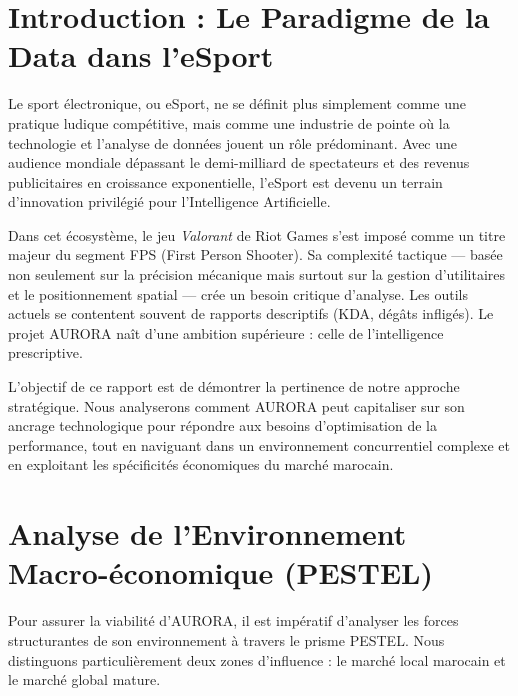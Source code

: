 \documentclass[a4paper,11pt]{article}
\begin{document}
\vspace{1cm}
\tableofcontents
\newpage
{}

\section{Introduction : Le Paradigme de la Data dans l'eSport}
Le sport électronique, ou eSport, ne se définit plus simplement comme une pratique ludique compétitive, mais comme une industrie de pointe où la technologie et l'analyse de données jouent un rôle prédominant. Avec une audience mondiale dépassant le demi-milliard de spectateurs et des revenus publicitaires en croissance exponentielle, l'eSport est devenu un terrain d'innovation privilégié pour l'Intelligence Artificielle.

Dans cet écosystème, le jeu \textit{Valorant} de Riot Games s'est imposé comme un titre majeur du segment FPS (First Person Shooter). Sa complexité tactique — basée non seulement sur la précision mécanique mais surtout sur la gestion d'utilitaires et le positionnement spatial — crée un besoin critique d'analyse. Les outils actuels se contentent souvent de rapports descriptifs (KDA, dégâts infligés). Le projet AURORA naît d'une ambition supérieure : celle de l'intelligence prescriptive. 

L'objectif de ce rapport est de démontrer la pertinence de notre approche stratégique. Nous analyserons comment AURORA peut capitaliser sur son ancrage technologique pour répondre aux besoins d'optimisation de la performance, tout en naviguant dans un environnement concurrentiel complexe et en exploitant les spécificités économiques du marché marocain.

\section{Analyse de l'Environnement Macro-économique (PESTEL)}
Pour assurer la viabilité d'AURORA, il est impératif d'analyser les forces structurantes de son environnement à travers le prisme PESTEL. Nous distinguons particulièrement deux zones d'influence : le marché local marocain et le marché global mature.
\end{document}
